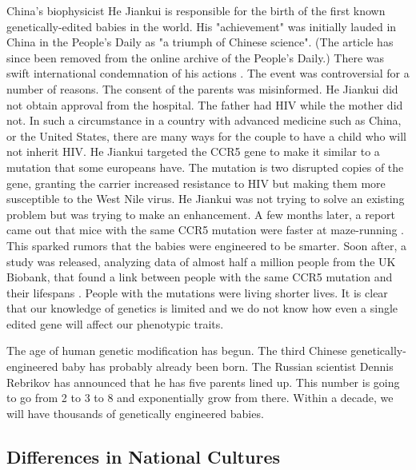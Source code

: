 China's biophysicist He Jiankui is responsible for the birth of the first known genetically-edited babies in the world.
His "achievement" was initially lauded in China in the People's Daily as "a triumph of Chinese science".
(The article has since been removed from the online archive of the People's Daily.)
There was swift international condemnation of his actions \cite{crisprbabies2018}.
The event was controversial for a number of reasons.
The consent of the parents was misinformed.
He Jiankui did not obtain approval from the hospital.
The father had HIV while the mother did not.
In such a circumstance in a country with advanced medicine such as China, or the United States, there are many ways for the couple to have a child who will not inherit HIV.
He Jiankui targeted the CCR5 gene to make it similar to a mutation that some europeans have.
The mutation is two disrupted copies of the gene, granting the carrier increased resistance to HIV but making them more susceptible to the West Nile virus.
He Jiankui was not trying to solve an existing problem but was trying to make an enhancement.
A few months later, a report came out that mice with the same CCR5 mutation were faster at maze-running \cite{Regalado2019}.
This sparked rumors that the babies were engineered to be smarter.
Soon after, a study was released, analyzing data of almost half a million people from the UK Biobank, that found a link between people with the same CCR5 mutation and their lifespans \cite{Wei2019}.
People with the mutations were living shorter lives.
It is clear that our knowledge of genetics is limited and we do not know how even a single edited gene will affect our phenotypic traits.

The age of human genetic modification has begun.
The third Chinese genetically-engineered baby has probably already been born.
The Russian scientist Dennis Rebrikov has announced that he has five parents lined up.
This number is going to go from 2 to 3 to 8 and exponentially grow from there.
Within a decade, we will have thousands of genetically engineered babies.

\subsection{Differences in National Cultures}

